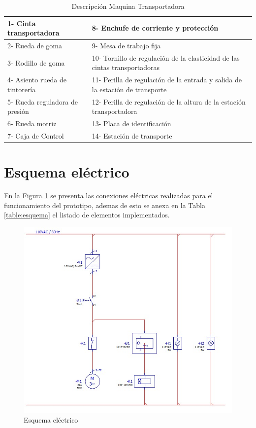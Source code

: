 		\begin{table}[ht]
			\centering
			\begin{tabular}{|p{5cm}|p{8cm}|}
				\hline
				1- Cinta transportadora & 8- Enchufe de corriente y protección \\ 
				\hline
				2- Rueda de goma& 9- Mesa de trabajo fija\\
				\hline
				3- Rodillo de goma& 10- Tornillo de regulación de la elasticidad de las cintas transportadoras\\
				\hline
				4- Asiento rueda de tintorería& 11- Perilla de regulación de la entrada y salida de la estación de transporte\\
				\hline
				5- Rueda reguladora de presión& 12- Perilla de regulación de la altura de la estación transportadora\\
				\hline
				6- Rueda motriz& 13- Placa de identificación\\
				\hline
				7- Caja de Control& 14- Estación de transporte\\
				\hline
			\end{tabular}	
			\caption{Descripción Maquina Transportadora}
			\label{table:Banda}
		\end{table}

\newpage
	\section{Esquema eléctrico}
		En la Figura \ref{fig:Esquema} se presenta las conexiones eléctricas realizadas para el funcionamiento del prototipo, ademas de esto se anexa en la Tabla \ref{table:esquema} el listado de elementos implementados.  
		\begin{figure}[ht]
			\centering
			\includegraphics[scale=0.5]{Figs/66.jpg}
			\caption{Esquema eléctrico}
			\label{fig:Esquema}
		\end{figure}
	
